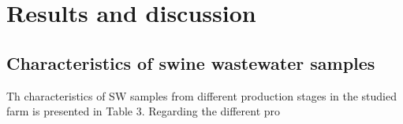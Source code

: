 \section{Results and discussion}
\subsection{Characteristics of swine wastewater samples}
Th characteristics of SW samples from different production stages in the studied farm is presented in Table 3. Regarding the different pro